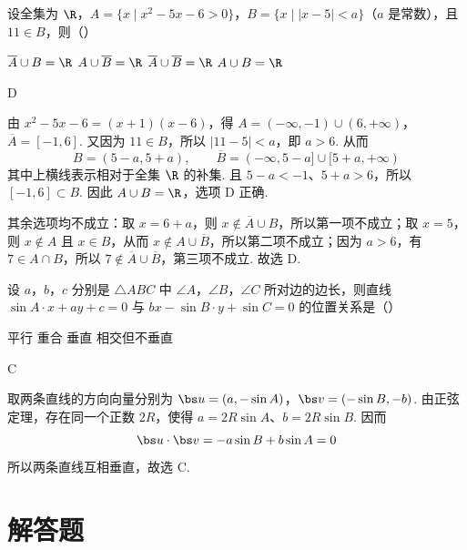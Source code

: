 \documentclass[UTF8,a4paper,oneside,11pt]{ctexbook}
\begin{document}
\begin{problem}
设全集为 \(\R\)，\(A=\{x\mid x^{2}-5x-6>0\}\)，\(B=\{x\mid \lvert x-5\rvert<a\}\)（\(a\) 是常数），且 \(11\in B\)，则（\quad）

\choices
    {\(\overline{A} \cup B = \R\)}
    {\(A \cup \overline{B} = \R\)}
    {\(\overline{A} \cup \overline{B} = \R\)}
    {\(A \cup B = \R\)}
\end{problem}

\begin{answer}
D
\end{answer}

\begin{solution}
由 \(x^2-5x-6=(x+1)(x-6)\)，得
\(A=(-\infty,-1)\cup(6,+\infty)\)，\(\overline A=[-1,6]\).
又因为 \(11\in B\)，所以 \(|11-5|<a\)，即 \(a>6\). 从而
\[
B=(5-a,5+a),\qquad \overline B=(-\infty,5-a]\cup[5+a,+\infty)
\]
其中上横线表示相对于全集 \(\R\) 的补集. 且 \(5-a<-1\)、\(5+a>6\)，所以 \([-1,6]\subset B\). 因此
\(A\cup B=\R\)，选项 D 正确.

其余选项均不成立：取 \(x=6+a\)，则 \(x\notin\overline A\cup B\)，所以第一项不成立；取 \(x=5\)，则 \(x\notin A\) 且 \(x\in B\)，从而 \(x\notin A\cup\overline B\)，所以第二项不成立；因为 \(a>6\)，有 \(7\in A\cap B\)，所以 \(7\notin\overline A\cup\overline B\)，第三项不成立. 故选 D.
\end{solution}

\begin{problem}
设 \(a\)，\(b\)，\(c\) 分别是 \(\triangle ABC\) 中 \(\angle A\)，\(\angle B\)，\(\angle C\) 所对边的边长，则直线 \(\sin A \cdot x + ay + c = 0\) 与 \(bx - \sin B \cdot y + \sin C = 0\) 的位置关系是（\quad）

\choices
    {平行}
    {重合}
    {垂直}
    {相交但不垂直}
\end{problem}

\begin{answer}
C
\end{answer}

\begin{solution}
取两条直线的方向向量分别为
\(\bs u=(a,-\sin A)\)，\(\bs v=(-\sin B,-b)\).
由正弦定理，存在同一个正数 \(2R\)，使得
\(a=2R\sin A\)、\(b=2R\sin B\). 因而
\[
\bs u\cdot\bs v=-a\sin B+b\sin A=0
\]
所以两条直线互相垂直，故选 C.
\end{solution}

\section{解答题}
\end{document}
